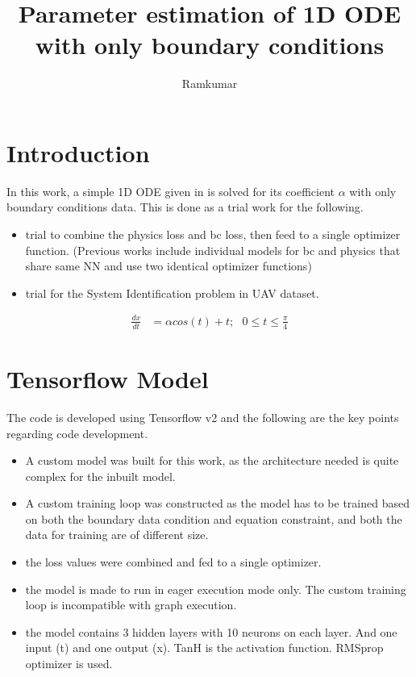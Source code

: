 \documentclass{article}
\title{Parameter estimation of 1D ODE with only boundary conditions}
\author{Ramkumar}
\begin{document}
\maketitle

\section{Introduction}
In this work, a simple 1D ODE given in  is solved for its
coefficient \(\alpha\) with only boundary conditions data. This is done
as a trial work for the following.
\begin{itemize}
	\item trial to combine the physics loss and bc loss, then feed to a
		single optimizer function. (Previous works include individual models
		for bc and physics that share same NN and use two identical optimizer
		functions)
	\item trial for the System Identification problem in UAV dataset.
\end{itemize}

\begin{align}
	\frac{dx}{dt} &= \alpha cos(t) + t; \ \ \ 0 \le t \le \frac{\pi}{4} \label{ode_eqn}
\end{align}

\section{Tensorflow Model}
The code is developed using Tensorflow v2 and the following are the key points
regarding code development.
\begin{itemize}
	\item A custom model was built for this work, as the architecture needed
		is quite complex for the inbuilt model.
	\item A custom training loop was constructed as the model has to be trained
		based on both the boundary data condition and equation constraint, and
		both the data for training are of different size.
	\item the loss values were combined and fed to a single optimizer.
	\item the model is made to run in eager execution mode only. The custom
		training loop is incompatible with graph execution.
	\item the model contains 3 hidden layers with 10 neurons on each layer. And
		one input (t) and one output (x). TanH is the activation function.
		RMSprop optimizer is used.
\end{itemize}
\end{document}
